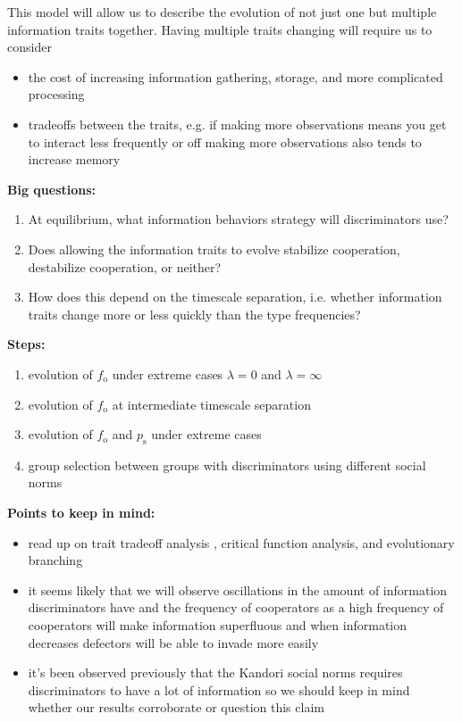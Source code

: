 \documentclass{article}
\begin{document}
This model will allow us to describe the evolution of not just one but multiple information traits together.  Having multiple traits changing will require us to consider
\begin{itemize}
\item the cost of increasing information gathering, storage, and more complicated processing
\item tradeoffs between the traits, e.g. if making more observations means you get to interact less frequently or off making more observations also tends to increase memory
\end{itemize}

{\bf Big questions:}

\begin{enumerate}
\item At equilibrium, what information behaviors strategy will discriminators use?
\item Does allowing the information traits to evolve stabilize cooperation, destabilize cooperation, or neither?
\item How does this depend on the timescale separation, i.e. whether information traits change more or less quickly than the type frequencies?
\end{enumerate}

{\bf Steps:}
\begin{enumerate}
\item evolution of $f_\text{o}$ under extreme cases $\lambda=0$ and $\lambda=\infty$
\item evolution of $f_\text{o}$ at intermediate timescale separation
\item evolution of $f_\text{o}$ and $p_\text{s}$ under extreme cases
\item group selection between groups with discriminators using different social norms
\end{enumerate}

{\bf Points to keep in mind:}
\begin{itemize}
\item read up on trait tradeoff analysis \cite{deMazancourt:2004uq}, critical function analysis, and evolutionary branching
\item it seems likely that we will observe oscillations in the amount of information discriminators have and the frequency of cooperators as a high frequency of cooperators will make information superfluous and when information decreases defectors will be able to invade more easily
\item it's been observed previously that the Kandori social norms requires discriminators to have a lot of information so we should keep in mind whether our results corroborate or question this claim
\end{itemize}



%
\vspace{-20pt}

\end{document}
